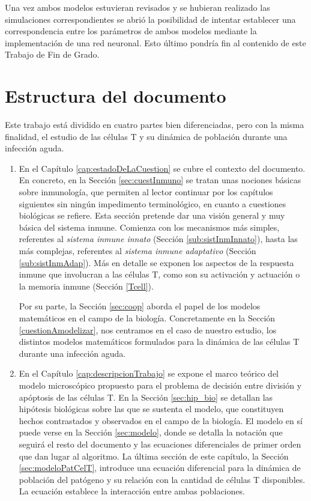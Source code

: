 Una vez ambos modelos estuvieran revisados y se hubieran realizado las simulaciones correspondientes se abrió la posibilidad de intentar establecer una correspondencia entre los parámetros de ambos modelos mediante la implementación de una red neuronal. Esto último pondría fin al contenido de este Trabajo de Fin de Grado.


\section{Estructura del documento}

Este trabajo está dividido en cuatro partes bien diferenciadas, pero con la misma finalidad, el estudio de las células T y su dinámica de población durante una infección aguda. 

\begin{enumerate}
	\item En el Capítulo \ref{cap:estadoDeLaCuestion} se cubre el contexto del documento. En concreto, en la Sección \ref{sec:cuestInmuno} se tratan unas nociones básicas sobre inmunología, que permiten al lector continuar por los capítulos siguientes sin ningún impedimento terminológico, en cuanto a cuestiones biológicas se refiere. Esta sección pretende dar una visión general y muy básica del sistema inmune. Comienza con los mecanismos más simples, referentes al \textit{sistema inmune innato} (Sección \ref{sub:sistInmInnato}), hasta las más complejas, referentes al \textit{sistema inmune adaptativo} (Sección \ref{sub:sistInmAdap}). Más en detalle se exponen los aspectos de la respuesta inmune que involucran a las células T, como son su activación y actuación o la memoria inmune (Sección \ref{Tcell}). 
	
	Por su parte, la Sección \ref{sec:coop} aborda el papel de los modelos matemáticos en el campo de la biología. Concretamente en la Sección \ref{cuestionAmodelizar}, nos centramos en el caso de nuestro estudio, los distintos modelos matemáticos formulados para la dinámica de las células T durante una infección aguda.
	 
	
	\item En el Capítulo \ref{cap:descripcionTrabajo} se expone el marco teórico del modelo microscópico propuesto para el problema de decisión entre división y apóptosis de las células T. En la Sección \ref{sec:hip_bio} se detallan las hipótesis biológicas sobre las que se sustenta el modelo, que constituyen hechos contrastados y observados en el campo de la biología. El modelo en sí puede verse en la Sección \ref{sec:modelo}, donde se detalla la notación que seguirá el resto del documento y las ecuaciones diferenciales de primer orden que dan lugar al algoritmo. La última sección de este capítulo, la Sección \ref{sec:modeloPatCelT}, introduce una ecuación diferencial para la dinámica de población del patógeno y su relación con la cantidad de células T disponibles. La ecuación establece la interacción entre ambas poblaciones.
	

\end{enumerate}
